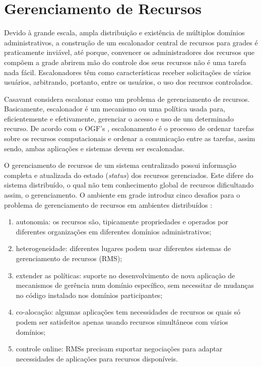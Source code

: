 \section{Gerenciamento de Recursos}

Devido à grande escala, ampla distribuição e existência de múltiplos domínios administrativos, a construção de um escalonador central de recursos para grades é praticamente inviável, até porque, convencer os administradores dos recursos que compõem a grade abrirem mão do controle dos seus recursos não é uma tarefa nada fácil. Escalonadores têm como características receber solicitações de vários usuários, arbitrando, portanto, entre os usuários, o uso dos recursos controlados.  

Casavant \cite{Thomas1996} considera escalonar como um problema de gerenciamento de recursos. Basicamente, escalonador é um mecanismo ou uma política usada para, eficientemente e efetivamente, gerenciar o acesso e uso de um determinado recurso. De acordo com o OGF's \cite{M.2002}, escalonamento é o processo de ordenar tarefas sobre os recursos computacionais e ordenar a comunicação entre as tarefas, assim sendo, ambas aplicações e sistemas devem ser escalonadas. 

O gerenciamento de recursos de um sistema centralizado possui informação completa e atualizada do estado (\emph{status}) dos recursos gerenciados. Este difere do sistema distribuído, o qual não tem conhecimento global de recursos dificultando assim, o gerenciamento. O ambiente em grade introduz cinco desafios para o problema de gerenciamento de recursos em ambientes distribuídos \cite{Karl1998}:

\begin{enumerate}
\item autonomia: os recursos são, tipicamente propriedades e operados por diferentes organizações em diferentes domínios administrativos;
\item heterogeneidade: diferentes lugares podem usar diferentes sistemas de gerenciamento de recursos (RMS);
\item extender as políticas: suporte no desenvolvimento de nova aplicação de mecanismos de gerência num domínio específico, sem necessitar de mudanças no código instalado nos domínios participantes;
\item co-alocação: algumas aplicações tem necessidades de recursos os quais só podem ser satisfeitos apenas usando recursos simultâneos com vários domínios;
\item controle online: RMSs precisam suportar negociações para adaptar necessidades de aplicações para recursos disponíveis.
\end{enumerate}

